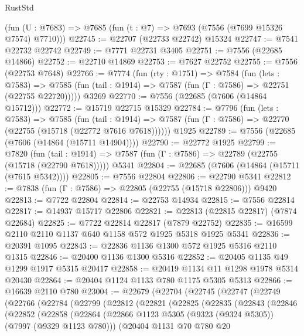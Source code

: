 \begin{lexlean}{RustStd}
\begin{coremodule}
    (fun (U : @7683) => @7685 (fun (t : @7) => @7693 (@7556 (@7699 @15326 @7574) @7710)))
@22745 := @22707 (@22733 @22742) @15324
@22747 := @7541 @22732 @22742
@22749 := @7771 @22731 @3405
@22751 := @7556 (@22685 @14866)
@22752 := @22710 @14869
@22753 := @7627 @22752
@22755 := @7556 (@22753 @7648)
@22766 := @7774
    (fun (rty : @1751) =>
    @7584
      (fun (lets : @7583) =>
      @7585 (fun (tail : @1914) => @7587 (fun (Γ : @7586) => @22751 (@22755 @22720)))))
    @3269
@22770 := @7556 (@22685 (@7606 (@14864 @15712)))
@22772 := @15719 @22715 @15329
@22784 := @7796
    (fun (lets : @7583) =>
    @7585
      (fun (tail : @1914) =>
      @7587 (fun (Γ : @7586) => @22770 (@22755 (@15718 (@22772 @7616 @7618))))))
    @1925
@22789 := @7556 (@22685 (@7606 (@14864 (@15711 @14904))))
@22790 := @22772 @1925
@22799 := @7820
    (fun (tail : @1914) => @7587 (fun (Γ : @7586) => @22789 (@22755 (@15718 (@22790 @7618)))))
    @5341
@22804 := @22685 (@7606 (@14864 (@15711 (@7615 @5342))))
@22805 := @7556 @22804
@22806 := @22790 @5341
@22812 := @7838 (fun (Γ : @7586) => @22805 (@22755 (@15718 @22806))) @9420
@22813 := @7722 @22804
@22814 := @22753 @14934
@22815 := @7556 @22814
@22817 := @14937 @15717 @22806
@22821 := @22813 (@22815 @22817) (@7874 @22684)
@22825 := @7722 @22814 @22817 (@7879 @22752)
@22835 := @16599 @2110 @2110 @1137 @640 @1158 @572 @1925 @5318 @1925 @5341
@22836 := @20391 @1095
@22843 := @22836 @1136 @1300 @572 @1925 @5316 @2110 @1315
@22846 := @20400 @1136 @1300 @5316
@22852 := @20405 @1135 @49 @1299 @1917 @5315 @20417
@22858 := @20419 @1134 @11 @1298 @1978 @5314 @20430
@22864 := @20404 @1124 @1133 @780 @1175 @5305 @5313
@22866 := @16639 @2110 @780
@23004 := @22679
    (@22704
      (@22745
        (@22747
          (@22749
            (@22766
              (@22784
                (@22799
                  (@22812
                    (@22821
                      (@22825
                        (@22835
                          (@22843
                            (@22846
                              (@22852
                                (@22858
                                  (@22864
                                    (@22866
                                      @1123
                                      @5305
                                      (@9323 (@9324 @5305))
                                      (@7997 (@9329 @1123 @780)))
                                    (@20404
                                      @1131
                                      @70
                                      @780
                                      @20

\end{coremodule}
\end{lexlean}

